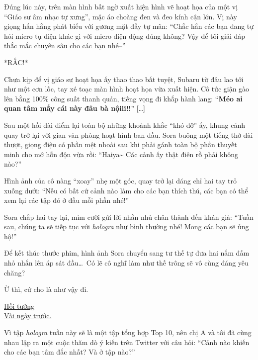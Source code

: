 \documentclass[../main.tex]{subfiles}
\begin{document}
Đúng lúc này, trên màn hình bất ngờ xuất hiện hình vẽ hoạt họa của một vị ``Giáo sư âm nhạc tự xưng'', mặc áo choàng đen và đeo kính cận lớn. Vị này giọng hấn hắng phát biểu với gương mặt đầy tự mãn: ``Chắc hẳn các bạn đang tự hỏi micro tụ điện khác gì với micro điện động đúng không? Vậy để tôi giải đáp thắc mắc chuyên sâu cho các bạn nhé--''

*RẮC!*

Chưa kịp để vị giáo sư hoạt họa ấy thao thao bất tuyệt, Subaru từ đâu lao tới như một cơn lốc, tay xé toạc màn hình hoạt họa vừa xuất hiện. Cô tức giận gào lên bằng 100\% công suất thanh quản, tiếng vọng đi khắp hành lang: ``\textbf{Méo ai quan tâm mấy cái này đâu bà nộiii!!}'' [\dots]

\il

Sau một hồi dài điểm lại toàn bộ những khoảnh khắc ``khó đỡ'' ấy, khung cảnh quay trở lại với gian văn phòng hoạt hình ban đầu. Sora buông một tiếng thở dài thượt, giọng điệu có phần mệt nhoài sau khi phải gánh toàn bộ phần thuyết minh cho mớ hỗn độn vừa rồi: ``Haiya\~{} Các cảnh ấy thật điên rồ phải không nào?''

Hình ảnh của cô nàng ``xoay'' nhẹ một góc, quay trở lại dáng chỉ hai tay trỏ xuống dưới: ``Nếu có bất cứ cảnh nào làm cho các bạn thích thú, các bạn có thể xem lại các tập đó ở đầu mỗi phần nhé!''

Sora chắp hai tay lại, mỉm cười gửi lời nhắn nhủ chân thành đến khán giả: ``Tuần sau, chúng ta sẽ tiếp tục với \textit{hologra} như bình thường nhé! Mong các bạn sẽ ủng hộ!''

Để kết thúc thước phim, hình ảnh Sora chuyển sang tư thế tự đưa hai nắm đấm nhỏ nhắn lên áp sát đầu\dots\ Có lẽ cô nghĩ làm như thế trông sẽ vô cùng đáng yêu chăng?


Ừ thì, cứ cho là như vậy đi.

\omk


\begin{center}
  \uline{Hồi tưởng\\Vài ngày trước.}
\end{center}

Vì tập \textit{hologra} tuần này sẽ là một tập tổng hợp Top 10, nên chị A và tôi đã cùng nhau lập ra một cuộc thăm dò ý kiến trên Twitter với câu hỏi: ``Cảnh nào khiến cho các bạn tâm đắc nhất? Và ở tập nào?''
\end{document}
